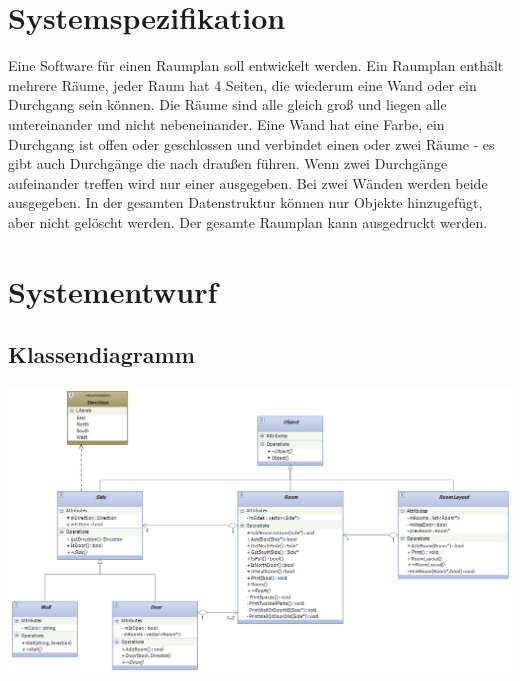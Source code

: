 \documentclass[12pt,a4paper]{article}
\begin{document}
\section{Systemspezifikation}
Eine Software für einen Raumplan soll entwickelt werden. Ein Raumplan enthält mehrere Räume, jeder Raum hat 4 Seiten, die wiederum eine Wand oder ein Durchgang sein können. Die Räume sind alle gleich groß und liegen alle untereinander und nicht nebeneinander. Eine Wand hat eine Farbe, ein Durchgang ist offen oder geschlossen und verbindet einen oder zwei Räume - es gibt auch Durchgänge die nach draußen führen. Wenn zwei Durchgänge aufeinander treffen wird nur einer ausgegeben. Bei zwei Wänden werden beide ausgegeben. In der gesamten Datenstruktur können nur Objekte hinzugefügt, aber nicht gelöscht werden. Der gesamte Raumplan kann ausgedruckt werden. \\


\newpage
\section {Systementwurf}

\subsection {Klassendiagramm}

\includegraphics[angle=90] {../Klassendiagramm.png}
\end{document}
